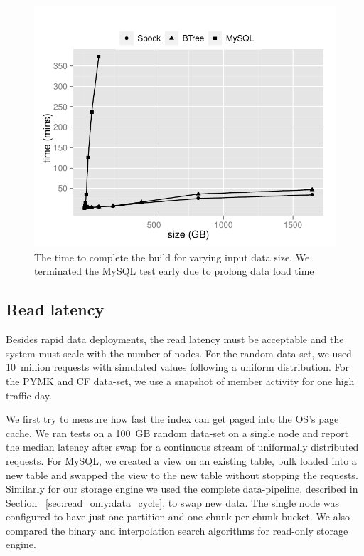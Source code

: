 \begin{figure}
  \centering
    \includegraphics[scale=0.55]{images/build.pdf}
  \caption{The time to complete the build for varying input data size. We terminated the MySQL test early due to prolong data load time} 
  \label{build}
\end{figure}

\subsection{Read latency}

Besides rapid data deployments, the read latency must be acceptable
and the system must scale with the number of nodes. For the random
data-set, we used 10~million requests with simulated values following
a uniform distribution. For the PYMK and CF data-set, we use a
snapshot of member activity for one high traffic day.

We first try to measure how fast the index can get paged into the OS's
page cache. We ran tests on a 100~GB random data-set on a single node
and report the median latency after swap for a continuous stream of 
uniformally distributed requests. For MySQL, we created a view 
on an existing table, bulk loaded into a new table and swapped the view 
to the new table without stopping the requests. Similarly for our 
storage engine we used the complete data-pipeline, described in Section
~\ref{sec:read_only:data_cycle}, to swap new data. The single node was 
configured to have just one partition and one chunk per chunk bucket. 
We also compared the binary and interpolation search algorithms for 
read-only storage engine.  

